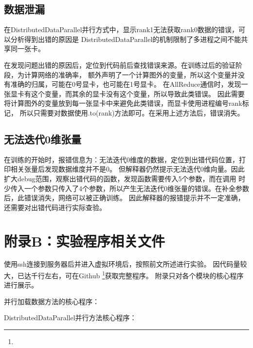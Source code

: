 \subsection*{数据泄漏}

在DistributedDataParallel并行方式中，显示rank1无法获取rank0数据的错误，可以分析得到出错的原因是
DistributedDataParallel的机制限制了多进程之间不能共享同一张卡。

在发现问题出错的原因后，定位到代码前后查找错误来源。在训练过后的验证阶段，为计算网络的准确率，
额外声明了一个计算图外的变量，所以这个变量并没有准确的归属，可能在0号显卡，也可能在1号显卡。
在AllReduce通信时，发现一张显卡有这个变量，而其余的显卡没有这个变量，所以导致此类错误。
因此需要将计算图外的变量放到每一张显卡中来避免此类错误，而显卡使用进程编号rank标记，
所以只需要对数据使用.to(rank)方法即可。在采用上述方法后，错误消失。

\subsection*{无法迭代0维张量}

在训练的开始时，报错信息为：无法迭代0维度的数据，定位到出错代码位置，打印相关张量后发现数据维度并不是0。
但解释器仍然提示无法迭代0维向量。因此扩大debug范围，观察出错代码的函数，发现函数需要传入5个参数，而在调用
时少传入一个参数只传入了4个参数，所以产生无法迭代0维张量的错误。在补全参数后，此错误消失，网络可以被正确训练。
因此解释器的报错提示并不一定准确，还需要对出错代码进行实际查验。

\section*{附录B：实验程序相关文件}

使用ssh连接到服务器后并进入虚拟环境后，按照前文所述进行实验。
因代码量较大，已达千行左右，可在Github
\footnote{\scriptsize{}}获取完整程序。
附录只对各个模块的核心程序进行展示。

并行加载数据方法的核心程序：
\begin{code}
    
\end{code}

DistributedDataParallel并行方法核心程序：
\begin{code}
    
\end{code}

